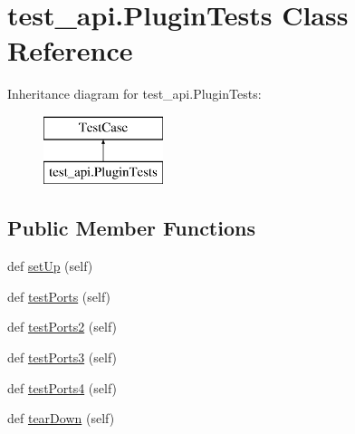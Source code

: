 \hypertarget{classtest__api_1_1_plugin_tests}{}\section{test\+\_\+api.\+Plugin\+Tests Class Reference}
\label{classtest__api_1_1_plugin_tests}
Inheritance diagram for test\+\_\+api.\+Plugin\+Tests\+:\begin{figure}[H]
\begin{center}
\leavevmode
\includegraphics[height=2.000000cm]{classtest__api_1_1_plugin_tests}
\end{center}
\end{figure}
\subsection*{Public Member Functions}
\begin{DoxyCompactItemize}
\item 
def \hyperlink{classtest__api_1_1_plugin_tests_ab49ff164fa513906834aae2d2d73a428}{set\+Up} (self)
\item 
def \hyperlink{classtest__api_1_1_plugin_tests_a66650fa921eaa0a48bf85f026c027714}{test\+Ports} (self)
\item 
def \hyperlink{classtest__api_1_1_plugin_tests_a76254b94d0818427c35115424ffece3a}{test\+Ports2} (self)
\item 
def \hyperlink{classtest__api_1_1_plugin_tests_ac97c3c8b5dac39725d21386dbe1a7b5f}{test\+Ports3} (self)
\item 
def \hyperlink{classtest__api_1_1_plugin_tests_aee9fec2bf90e9176b5116ffa98beca23}{test\+Ports4} (self)
\item 
def \hyperlink{classtest__api_1_1_plugin_tests_a497e99de4a8863aa551d21823381067e}{tear\+Down} (self)
\end{DoxyCompactItemize}
